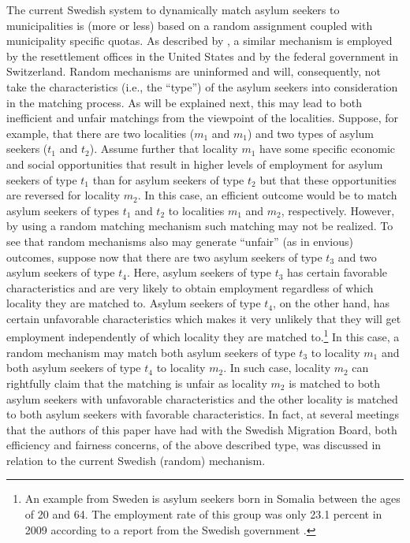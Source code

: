 \documentclass[12pt,fleqn]{article}
\begin{document}
The current Swedish system to dynamically match asylum seekers to municipalities is (more or less) based on a random assignment coupled with municipality specific quotas. As described by  \citet[][p.325]{bib:BansakEtAl}, a similar mechanism is employed by the resettlement offices in the United States and by the federal government in Switzerland. Random mechanisms are uninformed and will, consequently, not take the characteristics (i.e., the ``type'') of the asylum seekers into consideration in the matching process. As will be explained next, this may lead to both inefficient and unfair matchings from the viewpoint of the localities. Suppose, for example, that there are two localities ($m_1$ and $m_1$) and two types of asylum seekers ($t_1$ and $t_2$). Assume further that locality $m_1$ have some specific economic and social opportunities that result in higher levels of employment for asylum seekers of type $t_1$ than for asylum seekers of type $t_2$ but that these opportunities are reversed for locality $m_2$. In this case, an efficient outcome would be to match asylum seekers of types $t_1$ and $t_2$ to localities $m_1$ and $m_2$, respectively. However, by using a random matching mechanism such matching may not be realized. To see that random mechanisms also may generate ``unfair'' (as in envious) outcomes, suppose now that there are two asylum seekers of type $t_3$ and two asylum seekers of type $t_4$. Here, asylum seekers of type $t_3$ has certain favorable characteristics and are very likely to obtain employment regardless of which locality they are matched to. Asylum seekers of type $t_4$, on the other hand, has certain unfavorable characteristics which makes it very unlikely that they will get employment independently of which locality they are matched to.\footnote{An example from Sweden is asylum seekers born in Somalia between the ages of 20 and 64. The employment rate of this group was only 23.1 percent in 2009 according to a report from the Swedish government \citep[][p.26]{bib:CarlsonEtAl}.} In this case, a random mechanism may match both asylum seekers of type $t_3$ to locality $m_1$ and both asylum seekers of type $t_4$ to locality $m_2$. In such case, locality $m_2$ can rightfully claim that the matching is unfair as locality $m_2$ is matched to both asylum seekers with unfavorable characteristics and the other locality is matched to both asylum seekers with favorable characteristics. In fact, at several meetings that the authors of this paper have had with the Swedish Migration Board, both efficiency and fairness concerns, of the above described type, was discussed in relation to the current Swedish (random) mechanism.
\end{document}
